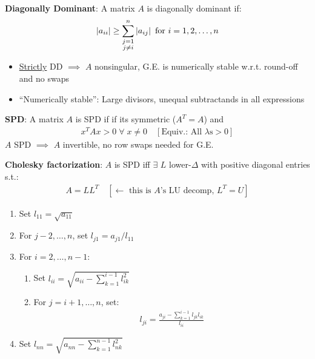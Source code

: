 \documentclass[12pt]{extarticle}
\begin{document}
\newp
{}

\newp
\textbf{Diagonally Dominant}: A matrix $A$ is diagonally dominant if: \begin{align*}
    \left|a_{ii}\right|\geq\sum_{\substack{j=1\\j\neq i}}^n\left|a_{ij}\right|\text{ for $i=1,2,\hdots,n$}
\end{align*} \begin{itemize}
    \item \ul{Strictly} DD $\implies$ $A$ nonsingular, G.E. is numerically stable w.r.t. round-off and no swaps
    \item ``Numerically stable'': Large divisors, unequal subtractands in all expressions
\end{itemize}

\newp
\textbf{SPD}: A matrix $A$ is SPD if if its symmetric ($A^T=A$) and \begin{align*}
    x^TAx>0\;\forall\;x\neq0 \quad[\text{Equiv.: All $\lambda$s$>0$}]
\end{align*}
$A$ SPD $\implies$ $A$ invertible, no row swaps needed for G.E.

\newp
\textbf{Cholesky factorization}: $A$ is SPD iff $\exists$ $L$ lower-$\Delta$ with positive diagonal entries s.t.: \begin{align*}
    A=LL^T\quad[\text{$\leftarrow$ this is $A$'s LU decomp, $L^T=U$}]
\end{align*}

\begin{whitebox}
    \begin{enumerate}
        \item Set $l_{11}=\sqrt{a_{11}}$
        \item For $j-2,\hdots,n$, set $l_{j1}=a_{j1}/l_{11}$
        \item For $i=2,\hdots,n-1$: \begin{enumerate}
            \item Set $l_{ii}=\sqrt{a_{ii}-\sum_{k=1}^{i-1}l_{ik}^2}$
            \item For $j=i+1,\hdots,n$, set: \begin{align*}
                l_{ji}=\frac{a_{ji}-\sum_{k=1}^{i-1}l_{jk}l_{ik}}{l_{ii}}
            \end{align*}
        \end{enumerate}
        \item Set $l_{nn}=\sqrt{a_{nn}-\sum_{k=1}^{n-1}l_{nk}^2}$
    \end{enumerate}
    
\end{whitebox}
\end{document}
